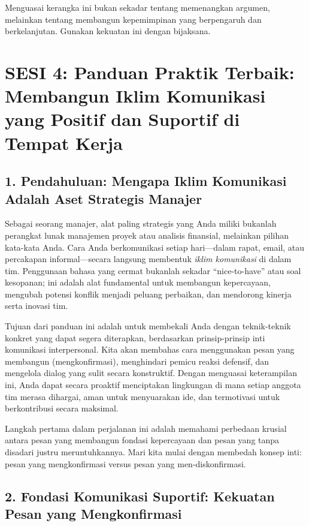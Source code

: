 \documentclass[
  letterpaper,
  DIV=11,
  numbers=noendperiod]{scrreprt}
\begin{document}
Menguasai kerangka ini bukan sekadar tentang memenangkan argumen,
melainkan tentang membangun kepemimpinan yang berpengaruh dan
berkelanjutan. Gunakan kekuatan ini dengan bijaksana.

\section{SESI 4: Panduan Praktik Terbaik: Membangun Iklim Komunikasi
yang Positif dan Suportif di Tempat
Kerja}\label{sesi-4-panduan-praktik-terbaik-membangun-iklim-komunikasi-yang-positif-dan-suportif-di-tempat-kerja}

\subsection{1. Pendahuluan: Mengapa Iklim Komunikasi Adalah Aset
Strategis
Manajer}\label{pendahuluan-mengapa-iklim-komunikasi-adalah-aset-strategis-manajer}

Sebagai seorang manajer, alat paling strategis yang Anda miliki bukanlah
perangkat lunak manajemen proyek atau analisis finansial, melainkan
pilihan kata-kata Anda. Cara Anda berkomunikasi setiap hari---dalam
rapat, email, atau percakapan informal---secara langsung membentuk
\emph{iklim komunikasi} di dalam tim. Penggunaan bahasa yang cermat
bukanlah sekadar ``nice-to-have'' atau soal kesopanan; ini adalah alat
fundamental untuk membangun kepercayaan, mengubah potensi konflik
menjadi peluang perbaikan, dan mendorong kinerja serta inovasi tim.

Tujuan dari panduan ini adalah untuk membekali Anda dengan teknik-teknik
konkret yang dapat segera diterapkan, berdasarkan prinsip-prinsip inti
komunikasi interpersonal. Kita akan membahas cara menggunakan pesan yang
membangun (mengkonfirmasi), menghindari pemicu reaksi defensif, dan
mengelola dialog yang sulit secara konstruktif. Dengan menguasai
keterampilan ini, Anda dapat secara proaktif menciptakan lingkungan di
mana setiap anggota tim merasa dihargai, aman untuk menyuarakan ide, dan
termotivasi untuk berkontribusi secara maksimal.

Langkah pertama dalam perjalanan ini adalah memahami perbedaan krusial
antara pesan yang membangun fondasi kepercayaan dan pesan yang tanpa
disadari justru meruntuhkannya. Mari kita mulai dengan membedah konsep
inti: pesan yang mengkonfirmasi versus pesan yang men-diskonfirmasi.

\subsection{2. Fondasi Komunikasi Suportif: Kekuatan Pesan yang
Mengkonfirmasi}\label{fondasi-komunikasi-suportif-kekuatan-pesan-yang-mengkonfirmasi}
\end{document}

